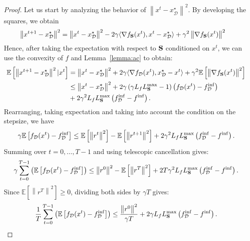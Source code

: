 \documentclass{article}
\newcommand{\bb}{\mathbb}
\newcommand{\norm}[1]{\left\| #1 \right\|}
\newcommand{\cD}{\mathcal{D}}
\newcommand{\Exp}[1]{{\bb E}\left[#1\right]}
\theoremstyle{plain}
\newcommand{\tf}{f_{\mathcal{D}}}
\newcommand{\mS}{{\bf S}}
\theoremstyle{plain}
\theoremstyle{definition}
\theoremstyle{remark}
\begin{document}
\begin{proof}
Let us start by analyzing the behavior of $\norm{x^t - x_\cD^\star}^2$. By developing the squares, we obtain
\begin{align*}
	\norm{x^{t+1} - x_\cD^\star}^2 &= \norm{x^t - x_\cD^\star}^2 - 2\gamma\langle \nabla f_{\mS}(x^t), x^t - x_\cD^\star\rangle + \gamma^2\norm{\nabla f_{\mS}(x^t)}^2
\end{align*}
Hence, after taking the expectation with respect to $\mS$ conditioned on $x^t$, we can use the convexity of $f$ and Lemma~\ref{lemma:ac} to obtain:
\begin{equation*}
	\begin{split}
		\Exp{\norm{x^{t+1} - x_\cD^\star}^2|x^t} & = \norm{x^t - x_\cD^\star}^2 + 2\gamma\langle \nabla \tf(x^t), x_\cD^\star - x^t\rangle + \gamma^2\Exp{\norm{\nabla f_{\mS}(x^t)}^2}\\
		&\leq \norm{x^t - x_\cD^\star}^2 + 2\gamma\left(\gamma L_fL_{\mS}^{\max}  - 1\right)\left(\tf(x^t) - \tf^{\inf}\right)\\
		& + 2\gamma^2L_fL_{\mS}^{\max}\left(\tf^{\inf} - f^{\inf}\right).
	\end{split}
\end{equation*}
Rearranging, taking expectation and taking into account the condition on the stepsize, we have
\begin{equation*}
	\begin{split}
		\gamma\Exp{\tf(x^t) - \tf^{\inf}} &\leq \Exp{\norm{r^t}^2} - \Exp{\norm{r^{t+1}}^2}
		+ 2\gamma^2L_fL_{\mS}^{\max}\left(\tf^{\inf} - f^{\inf}\right).\\
	\end{split}
\end{equation*}
Summing over $t = 0,\ldots, T-1$ and using telescopic cancellation gives:
\begin{equation*}
	\begin{split}
		\gamma\sum_{t=0}^{T-1}\left(\Exp{\tf(x^t) - \tf^{\inf}}\right) &\leq \norm{r^0}^2 - \Exp{\norm{r^{T}}^2}
		+ 2T\gamma^2L_fL_{\mS}^{\max}\left(\tf^{\inf} - f^{\inf}\right).\\
	\end{split}
\end{equation*}
Since $\Exp{\norm{r^{T}}^2} \geq 0$, dividing both sides by $\gamma T$ gives:
\begin{equation*}
	\begin{split}
		\frac{1}{T}\sum_{t=0}^{T-1}\left(\Exp{\tf(x^t) - \tf^{\inf}}\right) &\leq \frac{\norm{r^0}^2}{\gamma T} + 2\gamma L_fL_{\mS}^{\max}\left(\tf^{\inf} - f^{\inf}\right).\\

\end{split}
\end{equation*}
\end{proof}
\end{document}
